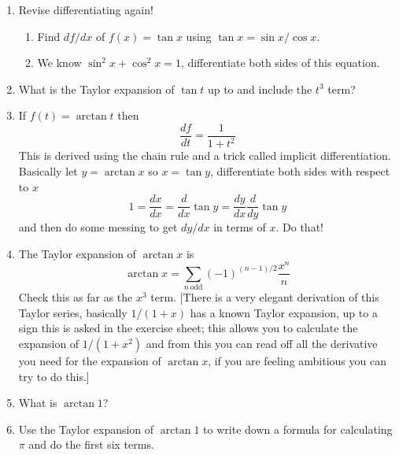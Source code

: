 \documentclass[12pt]{article}
\begin{document}
\begin{enumerate}


\item Revise differentiating  again!
\begin{enumerate}
\item Find $df/dx$ of $f(x)=\tan{x}$ using $\tan{x}=\sin{x}/\cos{x}$.
\item We know $\sin^2{x}+\cos^2{x}=1$, differentiate both sides of this equation.
\end{enumerate}

\item What is the Taylor expansion of $\tan{t}$ up to and include the $t^3$ term?

\item If $f(t)=\arctan{t}$ then 
\begin{equation}
\frac{df}{dt}=\frac{1}{1+t^2}
\end{equation}
This is derived using the chain rule and a trick called implicit differentiation. Basically let $y=\arctan{x}$ so $x=\tan{y}$, differentiate both sides with respect to $x$
\begin{equation}
1=\frac{dx}{dx}=\frac{d}{dx}\tan{y}=\frac{dy}{dx}\frac{d}{dy}\tan{y}
\end{equation}
and then do some messing to get $dy/dx$ in terms of $x$. Do that!


\item The Taylor expansion of $\arctan{x}$ is 
\begin{equation}
\arctan{x}=\sum_{n\,\mbox{odd}} (-1)^{(n-1)/2}\frac{x^n}{n}
\end{equation}
Check this as far as the $x^3$ term. [There is a very elegant derivation of this Taylor series, basically $1/(1+x)$ has a known Taylor expansion, up to a sign this is asked in the exercise sheet; this allows you to calculate the expansion of $1/(1+x^2)$ and from this you can read off all the derivative you need for the expansion of $\arctan{x}$, if you are feeling ambitious you can try to do this.]

\item What is $\arctan{1}$?

\item Use the Taylor expansion of $\arctan{1}$ to write down a formula
  for calculating $\pi$ and do the first six terms.



\end{enumerate}
\end{document}
